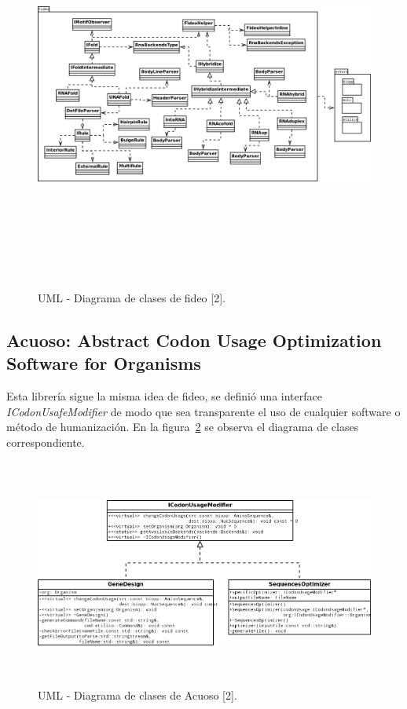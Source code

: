 \begin{figure}[!hbtp]
	\begin{center}
		\includegraphics[width=20.5cm, height=13cm, angle=90]{image/clasesFideo.png}
		\caption{UML - Diagrama de clases de fideo [2].}
		\label{fideitoDisenio1}
	\end{center}
\end{figure}

\vskip 10cm
\subsection{Acuoso: Abstract Codon Usage Optimization Software for Organisms}
Esta librería sigue la misma idea de fideo, se definió una interface \emph{ICodonUsafeModifier} de modo que sea transparente el uso de cualquier software o método de humanización. En la figura~\ref{acuosoInterface} se observa el diagrama de clases correspondiente.

\begin{figure}[!hbtp]
	\begin{center}
		\includegraphics[width=15.5cm, height=7.5cm]{image/acuoso.png}
		\caption{UML - Diagrama de clases de Acuoso [2].}
		\label{acuosoInterface}
	\end{center}
\end{figure}

